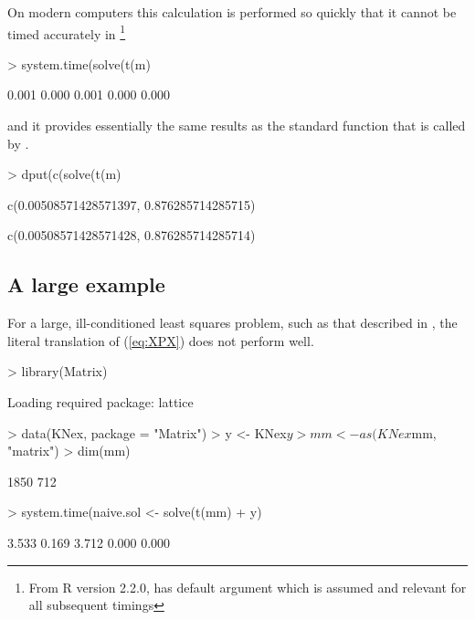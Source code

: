 \documentclass{article}
\begin{document}
On modern computers this calculation is performed so quickly that it cannot
be timed accurately in \RR{}
\footnote{From R version 2.2.0,  has default argument
   which is assumed and relevant for all subsequent timings}
\begin{Schunk}
\begin{Sinput}
> system.time(solve(t(m) %*% m) %*% t(m) %*% yo)
\end{Sinput}
\begin{Soutput}
[1] 0.001 0.000 0.001 0.000 0.000
\end{Soutput}
\end{Schunk}
and it provides essentially the same results as the standard
 function that is called by .
\begin{Schunk}
\begin{Sinput}
> dput(c(solve(t(m) %*% m) %*% t(m) %*% yo))
\end{Sinput}
\begin{Soutput}
c(0.00508571428571397, 0.876285714285715)
\end{Soutput}
\begin{Soutput}
c(0.00508571428571428, 0.876285714285714)
\end{Soutput}
\end{Schunk}

\subsection{A large example}
\label{sec:largeLSQ}

For a large, ill-conditioned least squares problem, such as that
described in \citet{koen:ng:2003}, the literal translation of
(\ref{eq:XPX}) does not perform well.
\begin{Schunk}
\begin{Sinput}
> library(Matrix)
\end{Sinput}
\begin{Soutput}
Loading required package: lattice
\end{Soutput}
\begin{Sinput}
> data(KNex, package = "Matrix")
> y <- KNex$y
> mm <- as(KNex$mm, "matrix")
> dim(mm)
\end{Sinput}
\begin{Soutput}
[1] 1850  712
\end{Soutput}
\begin{Sinput}
> system.time(naive.sol <- solve(t(mm) %*% mm) %*% t(mm) %*% 
+     y)
\end{Sinput}
\begin{Soutput}
[1] 3.533 0.169 3.712 0.000 0.000
\end{Soutput}
\end{Schunk}
\end{document}
